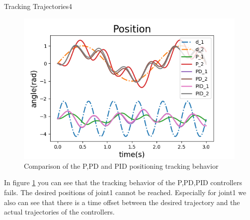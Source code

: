 \begin{questions}
\begin{question}{Tracking Trajectories}{4}
\begin{answer}
			\begin{minipage}{0.7\textwidth}
				\begin{figure}[H]
					\includegraphics[width=1\textwidth]{img/2dpos1.png} 
					\caption{\label{fig:2dpos1} Comparison of the P,PD and PID positioning tracking behavior}
				\end{figure}
			\end{minipage} \hfill
			\begin{minipage}{0.25\textwidth}
				In figure \ref{fig:2dpos1} you can see that the tracking behavior of the P,PD,PID controllers fails. The desired positions of joint1 cannot be reached. Especially for joint1 we also can see that there is a time offset between the desired trajectory and the actual trajectories of the controllers.
			\end{minipage}
	

\end{answer}
\end{question}
\end{questions}

